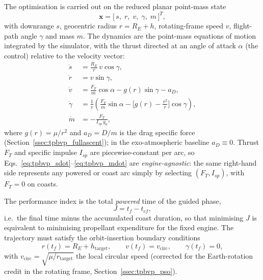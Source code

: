 The optimisation is carried out on the reduced planar point-mass state
\begin{equation}
  \mathbf{x} = \bigl[\,s,\; r,\; v,\; \gamma,\; m\,\bigr]^T,
  \label{eq:tpbvp_state}
\end{equation}
with downrange $s$, geocentric radius $r = R_E + h$, rotating-frame speed $v$,
flight-path angle $\gamma$ and mass $m$.  The dynamics are the point-mass
equations of motion integrated by the simulator, with the thrust directed at an
angle of attack $\alpha$ (the control) relative to the velocity vector:
\begin{align}
  \dot s      &= \frac{R_E}{r}\,v\cos\gamma, \label{eq:tpbvp_sdot}\\[3pt]
  \dot r      &= v\sin\gamma, \label{eq:tpbvp_rdot}\\[3pt]
  \dot v      &= \frac{F_T}{m}\cos\alpha - g(r)\sin\gamma - a_D, \label{eq:tpbvp_vdot}\\[3pt]
  \dot\gamma  &= \frac{1}{v}\!\left(\frac{F_T}{m}\sin\alpha
                 - \bigl[g(r) - \tfrac{v^2}{r}\bigr]\cos\gamma\right), \label{eq:tpbvp_gammadot}\\[3pt]
  \dot m      &= -\frac{F_T}{I_{sp}\,g_0}, \label{eq:tpbvp_mdot}
\end{align}
where $g(r) = \mu/r^2$ and $a_D = D/m$ is the drag specific force
(Section~\ref{ssec:tpbvp_fullascent}); in the exo-atmospheric baseline
$a_D \equiv 0$.  Thrust $F_T$ and specific impulse $I_{sp}$ are piecewise-constant
per arc, so Eqs.~\eqref{eq:tpbvp_sdot}--\eqref{eq:tpbvp_mdot} are
\emph{engine-agnostic}: the same right-hand side represents any powered or coast
arc simply by selecting $(F_T,I_{sp})$, with $F_T=0$ on coasts.

The performance index is the total \emph{powered} time of the guided phase,
\begin{equation}
  J = t_f - t_{cf},
  \label{eq:tpbvp_objective}
\end{equation}
i.e.\ the final time minus the accumulated coast duration, so that minimising $J$
is equivalent to minimising propellant expenditure for the fixed engine.  The
trajectory must satisfy the orbit-insertion boundary conditions
\begin{equation}
  r(t_f) = R_E + h_{\text{target}}, \qquad
  v(t_f) = v_{\text{circ}}, \qquad
  \gamma(t_f) = 0,
  \label{eq:tpbvp_bc}
\end{equation}
with $v_{\text{circ}} = \sqrt{\mu/r_{\text{target}}}$ the local circular speed
(corrected for the Earth-rotation credit in the rotating frame,
Section~\ref{ssec:tpbvp_pso}).

